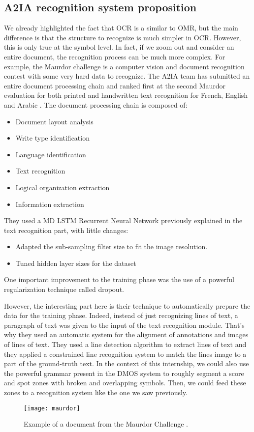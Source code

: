 \documentclass[11pt]{sdm}
\begin{document}
\subsection{A2IA recognition system proposition}

We already highlighted the fact that OCR is a similar to OMR, but the main difference is that the structure to recognize is much simpler in OCR.
However, this is only true at the symbol level.
In fact, if we zoom out and consider an entire document, the recognition process can be much more complex.
For example, the Maurdor challenge is a computer vision and document recognition contest with some very hard data to recognize.
The A2IA team has submitted an entire document processing chain and ranked first at the second Maurdor evaluation for both printed and handwritten text recognition for French, English and Arabic \cite{moysset_a2ia_2014}.
The document processing chain is composed of:
\begin{itemize}
  \item Document layout analysis
  \item Write type identification
  \item Language identification
  \item Text recognition
  \item Logical organization extraction
  \item Information extraction
\end{itemize}
They used a MD LSTM Recurrent Neural Network previously explained in the text recognition part, with little changes:
\begin{itemize}
  \item Adapted the sub-sampling filter size to fit the image resolution.
  \item Tuned hidden layer sizes for the dataset
\end{itemize}
One important improvement to the training phase was the use of a powerful regularization technique called dropout.

However, the interesting part here is their technique to automatically prepare the data for the training phase.
Indeed, instead of just recognizing lines of text, a paragraph of text was given to the input of the text recognition module.
That's why they used an automatic system for the alignment of annotations and images of lines of text.
They used a line detection algorithm to extract lines of text and they applied a constrained line recognition system to match the lines image to a part of the ground-truth text.
In the context of this internship, we could also use the powerful grammar present in the DMOS system to roughly segment a score and spot zones with broken and overlapping symbols.
Then, we could feed these zones to a recognition system like the one we saw previously.
\begin{figure}[btp]
  \texttt{[image: maurdor]}
  \caption{\label{maurdor} Example of a document from the Maurdor Challenge \cite{moysset_a2ia_2014}. }
\end{figure}
\end{document}
